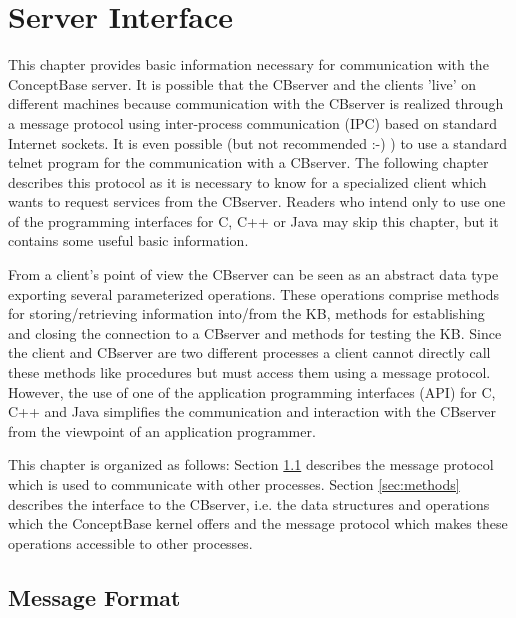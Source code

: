 
\chapter{Server Interface}
\label{serverinterface}
\label{cap:Server-Interface}

This chapter provides basic information necessary for communication with the
ConceptBase server.
It is possible that the
CBserver and the clients 'live' on different machines because communication
with the CBserver is realized through a message protocol using
inter-process communication (IPC) based on standard Internet sockets.
It is even possible (but not recommended :-) ) to use a standard telnet program
for the communication with a CBserver.
The following chapter describes this
protocol as it is necessary to know for a specialized client which wants to
request services from the CBserver. Readers who intend only to use one of
the programming interfaces for C, C++ or Java may skip this chapter, but it contains
some useful basic information.

From a client's point of view the CBserver can be seen as an abstract data
type exporting several parameterized operations. These operations comprise
methods for storing/retrieving information into/from the KB, methods for
establishing and closing the connection to a CBserver and methods for
testing the KB. Since the client and CBserver are two different processes a client cannot
directly call these methods like procedures but must access them using a
message protocol. However, the use of one of the application programming interfaces (API)
for C, C++ and Java simplifies the communication and interaction with the CBserver
from the viewpoint of an application programmer.

This chapter is organized as follows:
Section \ref{sec:MessageFormat} describes the message protocol which is used to communicate
with other processes. Section \ref{sec:methods} describes the interface to the CBserver,
i.e. the data structures and operations which the ConceptBase kernel offers
and the message protocol which makes these operations accessible to other
processes.






\section{Message Format}
\label{sec:MessageFormat}

